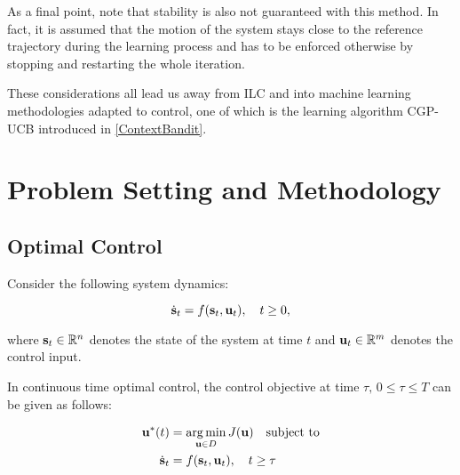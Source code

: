 As a final point, note that stability is also not guaranteed with this method. In fact, it is assumed that the motion of the system stays close to the reference trajectory during the learning process and has to be enforced otherwise by stopping and restarting the whole iteration.

These considerations all lead us away from ILC and into machine learning methodologies adapted to control, one of which is the learning algorithm CGP-UCB introduced in \ref{ContextBandit}.


\section{Problem Setting and Methodology} 
\label{methodology}

\subsection{Optimal Control}
Consider the following system dynamics: 

\begin{equation}
\dot{\mathbf{s}}_t = f(\mathbf{s}_t,\mathbf{u}_t), \quad  t \geq 0,
\label{eq:readDynamics}
\end{equation}

where $\mathbf{s}_t \in \mathbb{R}^n$ denotes the state of the system at time $t$ and $\mathbf{u}_t \in \mathbb{R}^m$ denotes the control input.  

In continuous time optimal control, the control objective at time $\tau, \, 0 \leq \tau \leq T$ can be given as follows:

\begin{equation}
\begin{aligned}
\mathbf{u}^{*}(t) &= \operatorname*{arg\, min}_{\mathbf{u} \in D} J(\mathbf{u}) \quad \text{subject to} \\
\dot{\mathbf{s}}_t &= f(\mathbf{s}_t,\mathbf{u}_t), \quad  t \geq \tau
\end{aligned}
\label{optimalControl}
\end{equation}


